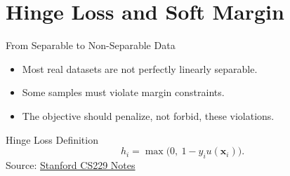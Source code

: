 \documentclass[10pt]{beamer}
\begin{document}
\section{Hinge Loss and Soft Margin}

\begin{frame}{From Separable to Non-Separable Data}
  \justifying
  \begin{itemize}
    \item Most real datasets are not perfectly linearly separable.
    \item Some samples must violate margin constraints.
    \item The objective should penalize, not forbid, these violations.
  \end{itemize}
\end{frame}

\begin{frame}{Hinge Loss Definition}
  \justifying
  \[
    h_i = \max\bigl(0,\ 1-y_i u(\bm{x}_i)\bigr).
  \]
  \vspace{0.3em}
  \footnotesize
  Source: \href{https://see.stanford.edu/materials/aimlcs229/cs229-notes3.pdf}{Stanford CS229 Notes}
\end{frame}





\end{document}
